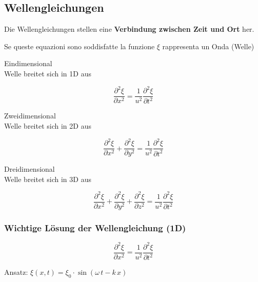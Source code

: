 \subsection{Wellengleichungen}

Die Wellengleichungen stellen eine \textbf{Verbindung zwischen Zeit und Ort} her.

Se queste equazioni sono soddisfatte la funzione $\xi$ rappresenta un Onda (Welle)

\medskip
\begin{minipage}{0.45\columnwidth}
    Eindimensional \\
    Welle breitet sich in 1D aus
\end{minipage}
\hfill
\begin{minipage}{0.48\columnwidth}
    $$\boxed{ \frac{\partial^2 \xi}{\partial x^2} = \frac{1}{u^2} \frac{\partial^2 \xi}{\partial t^2}  }$$
\end{minipage}

\begin{minipage}{0.45\columnwidth}
    Zweidimensional \\
    Welle breitet sich in 2D aus
\end{minipage}
\hfill
\begin{minipage}{0.48\columnwidth}
    $$\boxed{ \frac{\partial^2 \xi}{\partial x^2} + \frac{\partial^2 \xi}{\partial y^2} = \frac{1}{u^2} \frac{\partial^2 \xi}{\partial t^2}  }$$
\end{minipage}

\begin{minipage}{0.45\columnwidth}
    Dreidimensional \\
    Welle breitet sich in 3D aus
\end{minipage}
\hfill
\begin{minipage}{0.48\columnwidth}
    $$\boxed{ \frac{\partial^2 \xi}{\partial x^2} + \frac{\partial^2 \xi}{\partial y^2} + \frac{\partial^2 \xi}{\partial z^2} = \frac{1}{u^2} \frac{\partial^2 \xi}{\partial t^2}  }$$
\end{minipage}


\subsubsection{Wichtige Lösung der Wellengleichung (1D)}

\begin{minipage}{0.38\columnwidth}
    $$\frac{\partial^2 \xi}{\partial x^2} = \frac{1}{u^2} \frac{\partial^2 \xi}{\partial t^2} $$
\end{minipage}
\hfill
\begin{minipage}{0.58\columnwidth}
    Ansatz: $\xi(x,t) = \xi_0 \cdot \sin(\omega \, t - k \, x)$
\end{minipage}

